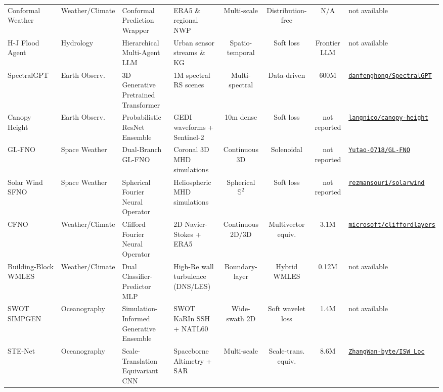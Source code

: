 \begin{table}[t]
{\begin{tabular}{@{}lp{2.0cm}p{3.0cm}p{3.4cm}cccp{3.0cm}@{}}
Conformal Weather~\cite{gopakumar2024conformal} & Weather/Climate & Conformal Prediction Wrapper & ERA5 \& regional NWP & Multi-scale & Distribution-free & N/A & not available \\
H-J Flood Agent~\cite{ji2025entropy} & Hydrology & Hierarchical Multi-Agent LLM & Urban sensor streams \& KG & Spatio-temporal & Soft loss & Frontier LLM & not available \\
SpectralGPT~\cite{hong2024spectralgpt} & Earth Observ. & 3D Generative Pretrained Transformer & 1M spectral RS scenes & Multi-spectral & Data-driven & 600M & \href{https://github.com/danfenghong/IEEE_TPAMI_SpectralGPT}{\texttt{danfenghong/SpectralGPT}} \\
Canopy Height~\cite{lang2023canopy} & Earth Observ. & Probabilistic ResNet Ensemble & GEDI waveforms + Sentinel-2 & 10m dense & Soft loss & not reported & \href{https://github.com/langnico/global-canopy-height-model}{\texttt{langnico/canopy-height}} \\
GL-FNO~\cite{du2024glfno} & Space Weather & Dual-Branch GL-FNO & Coronal 3D MHD simulations & Continuous 3D & Solenoidal & not reported & \href{https://github.com/Yutao-0718/GL-FNO}{\texttt{Yutao-0718/GL-FNO}} \\
Solar Wind SFNO~\cite{mansouri2025solarwind} & Space Weather & Spherical Fourier Neural Operator & Heliospheric MHD simulations & Spherical $\mathbb{S}^2$ & Soft loss & not reported & \href{https://github.com/rezmansouri/solarwind-sfno-velocity}{\texttt{rezmansouri/solarwind}} \\
CFNO~\cite{brandstetter2023clifford} & Weather/Climate & Clifford Fourier Neural Operator & 2D Navier-Stokes + ERA5 & Continuous 2D/3D & Multivector equiv. & 3.1M & \href{https://github.com/microsoft/cliffordlayers}{\texttt{microsoft/cliffordlayers}} \\
Building-Block WMLES~\cite{lozano2023buildingblock} & Weather/Climate & Dual Classifier-Predictor MLP & High-Re wall turbulence (DNS/LES) & Boundary-layer & Hybrid WMLES & 0.12M & not available \\
SWOT SIMPGEN~\cite{cutolo2025swot} & Oceanography & Simulation-Informed Generative Ensemble & SWOT KaRIn SSH + NATL60 & Wide-swath 2D & Soft wavelet loss & 1.4M & not available \\
STE-Net~\cite{wan2024ste} & Oceanography & Scale-Translation Equivariant CNN & Spaceborne Altimetry + SAR & Multi-scale & Scale-trans. equiv. & 8.6M & \href{https://github.com/ZhangWan-byte/Internal_Solitary_Wave_Localization}{\texttt{ZhangWan-byte/ISW\_Loc}} \\

\end{tabular}}
\end{table}
